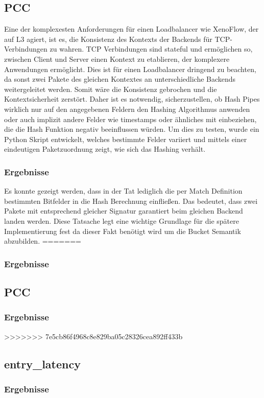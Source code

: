 \documentclass[paper=a4, fontsize=11pt]{scrartcl} %
\numberwithin{equation}{section} %
\numberwithin{figure}{section} %
\numberwithin{table}{section} %
\begin{document}
\subsection{PCC}
Eine der komplexesten Anforderungen für einen Loadbalancer wie XenoFlow, der auf L3 agiert, ist es, die Konsistenz des Kontexts der Backends für TCP-Verbindungen zu wahren. TCP Verbindungen sind stateful und ermöglichen so, zwischen Client und Server einen Kontext zu etablieren, der komplexere Anwendungen ermöglicht. Dies ist für einen Loadbalancer dringend zu beachten, da sonst zwei Pakete des gleichen Kontextes an unterschiedliche Backends weitergeleitet werden. Somit wäre die Konsistenz gebrochen und die Kontextsicherheit zerstört. Daher ist es notwendig, sicherzustellen, ob Hash Pipes wirklich nur auf den angegebenen Feldern den Hashing Algorithmus anwenden oder auch implizit andere Felder wie timestamps oder ähnliches mit einbeziehen, die die Hash Funktion negativ beeinflussen würden. Um dies zu testen, wurde ein Python Skript entwickelt, welches bestimmte Felder variiert und mittels einer eindeutigen Paketzuordnung zeigt, wie sich das Hashing verhält.
\subsubsection{Ergebnisse}
Es konnte gezeigt werden, dass in der Tat lediglich die per Match Definition bestimmten Bitfelder in die Hash Berechnung einfließen. Das bedeutet, dass zwei Pakete mit entsprechend gleicher Signatur garantiert beim gleichen Backend landen werden. Diese Tatsache legt eine wichtige Grundlage für die spätere Implementierung fest da dieser Fakt benötigt wird um die Bucket Semantik abzubilden.
=======
\subsubsection{Ergebnisse}
\subsection{PCC}
\subsubsection{Ergebnisse}
>>>>>>> 7e5cb86f4968c8e829ba05c28326cea892ff433b
\subsection{entry\_latency}
\subsubsection{Ergebnisse}
\end{document}
